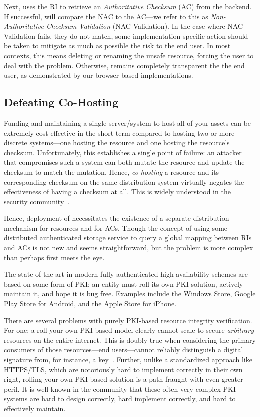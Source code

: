 Next, \SYSTEM{} uses the RI to retrieve an \emph{Authoritative Checksum} (AC)
from the backend. If successful, \SYSTEM{} will compare the NAC to the AC---we
refer to this as \emph{Non-Authoritative Checksum Validation} (NAC Validation).
In the case where NAC Validation fails, \ie they do not match, some
implementation-specific action should be taken to mitigate as much as possible
the risk to the end user. In most contexts, this means deleting or renaming the
unsafe resource, forcing the user to deal with the problem. Otherwise, \SYSTEM{}
remains completely transparent the the end user, as demonstrated by our
browser-based implementations.

\subsection{Defeating Co-Hosting}

Funding and maintaining a single server/system to host all of your assets can be
extremely cost-effective in the short term compared to hosting two or more
discrete systems---one hosting the resource and one hosting the resource's
checksum. Unfortunately, this establishes a single point of failure: an attacker
that compromises such a system can both mutate the resource and update the
checksum to match the mutation. Hence, \emph{co-hosting} a resource and its
corresponding checksum on the same distribution system virtually negates the
effectiveness of having a checksum at all. This is widely understood in the
security community~\cite{SCA-MINT2}.

Hence, deployment of \SYSTEM{} necessitates the existence of a separate
distribution mechanism for resources and for ACs. Though the concept of using
some distributed authenticated storage service to query a global mapping between
RIs and ACs is not new and seems straightforward, but the problem is more
complex than perhaps first meets the eye.

The state of the art in modern fully authenticated high availability schemes are
based on some form of PKI; an entity must roll its own PKI solution, actively
maintain it, and hope it is bug free. Examples include the Windows Store, Google
Play Store for Android, and the Apple Store for iPhone.

There are several problems with purely PKI-based resource integrity
verification. For one: a roll-your-own PKI-based model clearly cannot scale to
secure \emph{arbitrary} resources on the entire internet. This is doubly true
when considering the primary consumers of those resources---end users---cannot
reliably distinguish a digital signature from, for instance, a key~\cite{PGPBad,
Tan, Hsiao, Cherubini}. Further, unlike a standardized approach like HTTPS/TLS,
which are notoriously hard to implement correctly in their own right, rolling
your own PKI-based solution is a path fraught with even greater peril. It is
well known in the community that these often very complex PKI systems are hard
to design correctly, hard implement correctly, and hard to effectively maintain.

